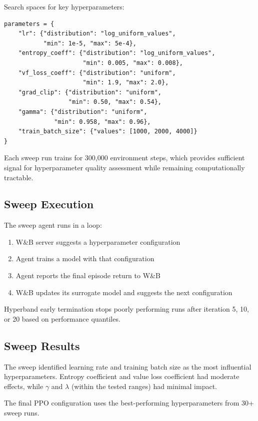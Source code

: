 \documentclass[english,bachelor]{hsluthesis}
\begin{document}
Search spaces for key hyperparameters:

\begin{verbatim}
parameters = {
    "lr": {"distribution": "log_uniform_values",
           "min": 1e-5, "max": 5e-4},
    "entropy_coeff": {"distribution": "log_uniform_values",
                      "min": 0.005, "max": 0.008},
    "vf_loss_coeff": {"distribution": "uniform",
                      "min": 1.9, "max": 2.0},
    "grad_clip": {"distribution": "uniform",
                  "min": 0.50, "max": 0.54},
    "gamma": {"distribution": "uniform",
              "min": 0.958, "max": 0.96},
    "train_batch_size": {"values": [1000, 2000, 4000]}
}
\end{verbatim}

Each sweep run trains for 300,000 environment steps, which provides sufficient signal for hyperparameter quality assessment while remaining computationally tractable.

\subsection{Sweep Execution}

The sweep agent runs in a loop:

\begin{enumerate}
    \item W\&B server suggests a hyperparameter configuration
    \item Agent trains a model with that configuration
    \item Agent reports the final episode return to W\&B
    \item W\&B updates its surrogate model and suggests the next configuration
\end{enumerate}

Hyperband early termination stops poorly performing runs after iteration 5, 10, or 20 based on performance quantiles.

\subsection{Sweep Results}

The sweep identified learning rate and training batch size as the most influential hyperparameters. Entropy coefficient and value loss coefficient had moderate effects, while $\gamma$ and $\lambda$ (within the tested ranges) had minimal impact.

The final PPO configuration uses the best-performing hyperparameters from 30+ sweep runs.
\end{document}
